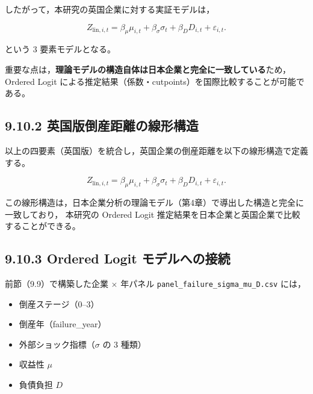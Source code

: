 したがって，本研究の英国企業に対する実証モデルは，



\[
Z_{\text{lin},i,t}
= \beta_\mu \mu_{i,t}
+ \beta_\sigma \sigma_{t}
+ \beta_D D_{i,t}
+ \varepsilon_{i,t}.
\]



という 3 要素モデルとなる。

重要な点は，\textbf{理論モデルの構造自体は日本企業と完全に一致している}ため，
Ordered Logit による推定結果（係数・cutpoints）を国際比較することが可能である。


\subsection*{9.10.2 英国版倒産距離の線形構造}

以上の四要素（英国版）を統合し，英国企業の倒産距離を以下の線形構造で定義する。



\[
Z_{\text{lin},i,t}
= \beta_\mu \mu_{i,t}
+ \beta_\sigma \sigma_{t}
+ \beta_D D_{i,t}
+ \varepsilon_{i,t}.
\]



この線形構造は，日本企業分析の理論モデル（第4章）で導出した構造と完全に一致しており，
本研究の Ordered Logit 推定結果を日本企業と英国企業で比較することができる。


\subsection*{9.10.3 Ordered Logit モデルへの接続}

前節（9.9）で構築した企業 $\times$ 年パネル
\texttt{panel\_failure\_sigma\_mu\_D.csv} には，

\begin{itemize}
    \item 倒産ステージ（0--3）
    \item 倒産年（failure\_year）
    \item 外部ショック指標（$\sigma$ の 3 種類）
    \item 収益性 $\mu$
    \item 負債負担 $D$
\end{itemize}

